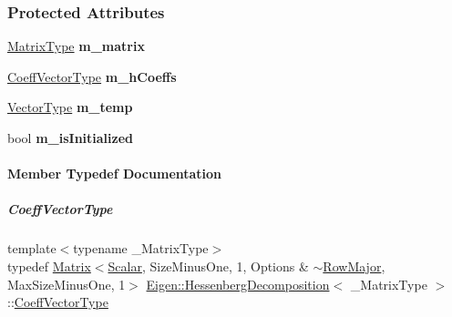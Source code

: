 \subsubsection*{Protected Attributes}
\begin{DoxyCompactItemize}
\item 
\mbox{\label{group___eigenvalues___module_aa37e9ef28812c38b5d2a99ebdd67277f}} 
\hyperlink{group___eigenvalues___module_a93a611350a7db9d1da18f2c828ecea9f}{Matrix\+Type} {\bfseries m\+\_\+matrix}
\item 
\mbox{\label{group___eigenvalues___module_a65281ce248fefb2c6cf4ebb0eba5289c}} 
\hyperlink{group___eigenvalues___module_a567f99f3770365777b67bf9832b6fac1}{Coeff\+Vector\+Type} {\bfseries m\+\_\+h\+Coeffs}
\item 
\mbox{\label{group___eigenvalues___module_a5b3d07e71cfdd559089eb8fb3d17394d}} 
\hyperlink{group___core___module}{Vector\+Type} {\bfseries m\+\_\+temp}
\item 
\mbox{\label{group___eigenvalues___module_a44ab95fd14edfdb937776d841e24af7b}} 
bool {\bfseries m\+\_\+is\+Initialized}
\end{DoxyCompactItemize}


\paragraph{Member Typedef Documentation}
\mbox{\label{group___eigenvalues___module_a567f99f3770365777b67bf9832b6fac1}} 
\subparagraph{\texorpdfstring{Coeff\+Vector\+Type}{CoeffVectorType}\hspace{0.1cm}{\footnotesize\ttfamily [1/2]}}
{\footnotesize\ttfamily template$<$typename \+\_\+\+Matrix\+Type$>$ \\
typedef \hyperlink{group___core___module_class_eigen_1_1_matrix}{Matrix}$<$\hyperlink{group___eigenvalues___module_a9420c36226cae7d92da8308a3f97ac2f}{Scalar}, Size\+Minus\+One, 1, Options \& $\sim$\hyperlink{group__enums_ggaacded1a18ae58b0f554751f6cdf9eb13acfcde9cd8677c5f7caf6bd603666aae3}{Row\+Major}, Max\+Size\+Minus\+One, 1$>$ \hyperlink{group___eigenvalues___module_class_eigen_1_1_hessenberg_decomposition}{Eigen\+::\+Hessenberg\+Decomposition}$<$ \+\_\+\+Matrix\+Type $>$\+::\hyperlink{group___eigenvalues___module_a567f99f3770365777b67bf9832b6fac1}{Coeff\+Vector\+Type}}



